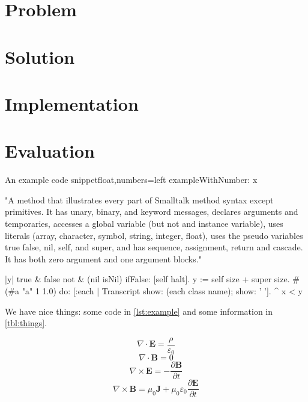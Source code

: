 \section{Problem}
\label{sec:problem}


\section{Solution}
\label{sec:solution}


\section{Implementation}
\label{sec:implementation}


\section{Evaluation}
\label{sec:evaluation}

\lstset{language=Smalltalk}
\begin{code}{An example code snippet}{float,numbers=left}
exampleWithNumber: x

"A method that illustrates every part of Smalltalk method syntax
except primitives. It has unary, binary, and keyword messages,
declares arguments and temporaries, accesses a global variable
(but not and instance variable), uses literals (array, character,
symbol, string, integer, float), uses the pseudo variables
true false, nil, self, and super, and has sequence, assignment,
return and cascade. It has both zero argument and one argument blocks."

    |y|
    true & false not & (nil isNil) ifFalse: [self halt].
    y := self size + super size.
    #(#a "a" 1 1.0)
        do: [:each | Transcript show: (each class name);
                                 show: ' '].
     ^ x < y
\end{code}


We have nice things: some code in \autoref{lst:example} and some information
in \autoref{tbl:things}.

\[\nabla \cdot \mathbf{E} = \frac{\rho}{\varepsilon_0}\]
\[\nabla \cdot \mathbf{B} = 0\]
\[\nabla \times \mathbf{E} = -\frac {\partial \mathbf{B}}{\partial t}\]
\[\nabla \times \mathbf{B} = \mu_0 \mathbf{J} + \mu_0\varepsilon_0  \frac{\partial \mathbf{E}}{\partial t}\]


